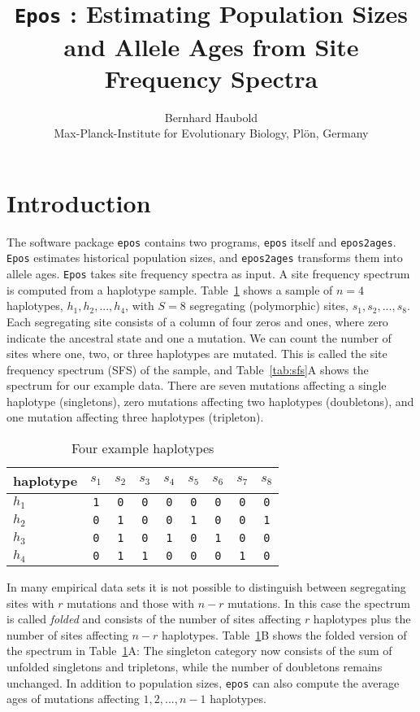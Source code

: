 \documentclass[a4paper, english]{article}
\newcommand{\ty}{\texttt}
\begin{document}
\title{\ty{Epos} : Estimating Population Sizes and Allele Ages from
  Site Frequency Spectra}
\author{Bernhard Haubold\\\small Max-Planck-Institute for Evolutionary
  Biology, Pl\"on, Germany}
\date{}
\maketitle
\section{Introduction} 
The software package \ty{epos} contains two programs, \ty{epos}
itself and \ty{epos2ages}. \ty{Epos} estimates historical population
sizes, and \ty{epos2ages} transforms them into allele ages. \ty{Epos} takes site frequency spectra as input. A site frequency
spectrum is computed from a haplotype sample. Table~\ref{tab:hap}
shows a sample of $n=4$ haplotypes, $h_1, h_2,...,h_4$, with $S=8$
segregating (polymorphic) sites, $s_1, s_2,...,s_8$. Each segregating
site consists of a column of four zeros and ones, where zero indicate
the ancestral state and one a mutation. We can count the number of
sites where one, two, or three haplotypes are mutated. This is called
the site frequency spectrum (SFS) of the sample, and
Table~\ref{tab:sfs}A shows the spectrum for our example data. There
are seven mutations affecting a single haplotype (singletons), zero
mutations affecting two haplotypes (doubletons), and one mutation
affecting three haplotypes (tripleton).
\begin{table}
  \caption{Four example haplotypes}\label{tab:hap}
  \begin{center}
    \begin{tabular}{lcccccccc}\hline
haplotype   &   $s_1$ & $s_2$ & $s_3$ & $s_4$ & $s_5$ & $s_6$ & $s_7$ & $s_8$\\\hline
$h_1$ &      \ty{1} & \ty{0} & \ty{0} & \ty{0} & \ty{0} & \ty{0} & \ty{0} & \ty{0}\\
$h_2$ &      \ty{0} & \ty{1} & \ty{0} & \ty{0} & \ty{1} & \ty{0} & \ty{0} & \ty{1}\\
$h_3$ &      \ty{0} & \ty{1} & \ty{0} & \ty{1} & \ty{0} & \ty{1} & \ty{0} & \ty{0}\\
$h_4$ &      \ty{0} & \ty{1} & \ty{1} & \ty{0} & \ty{0} & \ty{0} & \ty{1} &
      \ty{0}\\\hline
      \end{tabular}
  \end{center}
\end{table}
In many empirical data sets it is not possible to distinguish between
segregating sites with $r$ mutations and those with $n-r$
mutations. In this case the spectrum is called \textit{folded} and
consists of the
number of sites affecting $r$ haplotypes plus the number of sites
affecting $n-r$ haplotypes. Table~\ref{tab:hap}B shows the folded
version of the spectrum in Table~\ref{tab:hap}A: The singleton
category now consists of the sum of unfolded singletons and
tripletons, while the number of doubletons
remains unchanged.
In addition to population sizes, \ty{epos} can also compute the
average ages of mutations affecting $1, 2,...,n-1$ haplotypes.
\end{document}
